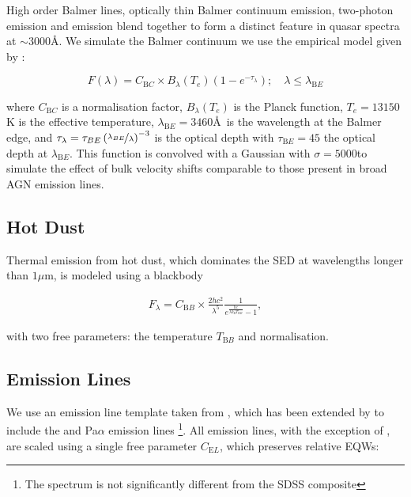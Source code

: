 High order Balmer lines, optically thin Balmer continuum emission, two-photon emission and  emission blend together to form a distinct feature in quasar spectra at $\sim3000$\AA. 
We simulate the Balmer continuum we use the empirical model given by \citet{grandi82}: 

\begin{equation}
  F(\lambda) = C_{\mathrm BC} \times B_\lambda(T_e)(1-e^{-\tau_\lambda}); \quad \lambda \leq \lambda_{\mathrm BE}
\end{equation}

where $C_{\mathrm BC}$ is a normalisation factor, $B_\lambda(T_e)$ is the Planck function, $T_e=13150$K is the effective temperature, $\lambda_{\mathrm BE}=3460$\AA\, is the wavelength at the Balmer edge, and $\tau_\lambda = \tau_{BE}\left( \nicefrac{\lambda_{BE}} {\lambda} \right)^{-3}$ is the optical depth with $\tau_{\mathrm BE}=45$ the optical depth at $\lambda_{\mathrm BE}$. 
This function is convolved with a Gaussian with $\sigma=5000$\kms to simulate the effect of bulk velocity shifts comparable to those present in broad AGN emission lines. 

\subsection{Hot Dust}

Thermal emission from hot dust, which dominates the SED at wavelengths longer than $1\mu$m, is modeled using a blackbody

\begin{eqnarray}  
  F_\lambda = C_{\mathrm BB} \times \frac{2 hc^2}{\lambda^5}\frac{1}{ e^{\frac{hc}{\lambda k_\mathrm{B}T_{\mathrm BB}}} - 1}, 
\end{eqnarray}

with two free parameters: the temperature $T_{\mathrm BB}$ and normalisation. 

\subsection{Emission Lines}

We use an emission line template taken from \citet{francis91}, which has been extended by \citet{maddox06} to include the \hans and Pa$\alpha$ emission lines \footnote{The spectrum is not significantly different from the \citet{vandenberk01} SDSS composite}. 
All emission lines, with the exception of \hans, are scaled using a single free parameter $C_{\mathrm EL}$, which preserves relative EQWs:

